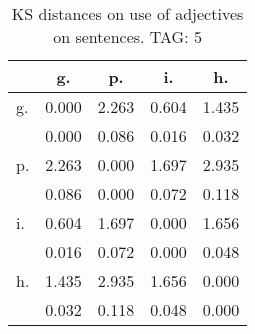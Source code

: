\begin{table}[h!]
\begin{center}
\begin{tabular}{| l | c | c | c | c |}\hline
 & g. & p. & i. & h. \\\hline
g. & 0.000  & 2.263  & 0.604  & 1.435 \\\hline
 & 0.000  & 0.086  & 0.016  & 0.032 \\\hline
p. & 2.263  & 0.000  & 1.697  & 2.935 \\\hline
 & 0.086  & 0.000  & 0.072  & 0.118 \\\hline
i. & 0.604  & 1.697  & 0.000  & 1.656 \\\hline
 & 0.016  & 0.072  & 0.000  & 0.048 \\\hline
h. & 1.435  & 2.935  & 1.656  & 0.000 \\\hline
 & 0.032  & 0.118  & 0.048  & 0.000 \\\hline
\end{tabular}
\caption{KS distances on use of adjectives on sentences. TAG: 5}
\end{center}
\end{table}